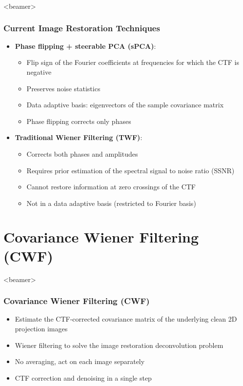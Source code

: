 \documentclass{beamer}
\begin{document}
\begin{frame}<beamer>
\frametitle{Current Image Restoration Techniques}
\begin{itemize}[<+->]
 \item \textbf{Phase flipping + steerable PCA (sPCA)}: 
  \begin{itemize}
  \item  Flip sign of the Fourier
coefficients at frequencies for which the CTF is negative
   \item Preserves noise statistics
   \item Data adaptive basis: eigenvectors of the sample covariance matrix
   \item Phase flipping corrects only phases
  \end{itemize}
 \item \textbf{Traditional Wiener Filtering (TWF)}:
 \begin{itemize}
  \item  Corrects both phases and amplitudes
  \item Requires prior estimation of the spectral signal to
 noise ratio (SSNR)
  \item  Cannot restore information at zero crossings of the CTF
  \item Not in a data adaptive basis (restricted to Fourier basis)
 \end{itemize}
\end{itemize}
\end{frame}


\section{Covariance Wiener Filtering (CWF)}
\begin{frame}<beamer>
\frametitle{Covariance Wiener Filtering (CWF)}
\begin{itemize}[<+->]
 \item Estimate the CTF-corrected covariance matrix of the
underlying clean 2D projection images
\item Wiener filtering to solve the image restoration deconvolution problem
\item No averaging, act on each image separately
\item CTF correction and denoising in a single step
\end{itemize}
\end{frame}
\end{document}
